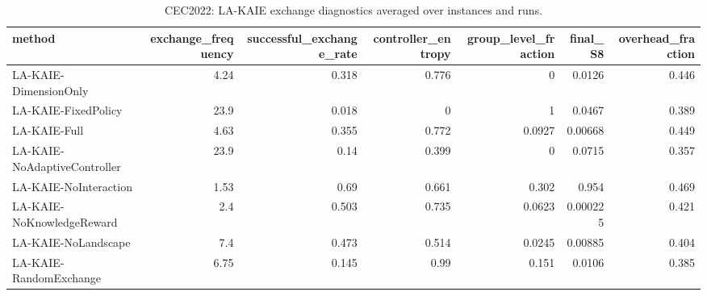 \begin{table}[t]
\centering
\scriptsize
\caption{CEC2022: LA-KAIE exchange diagnostics averaged over instances and runs.}
\label{tab:cec2022_exchange}
\begin{tabular}{lrrrrrr}
\toprule
method & exchange\_frequency & successful\_exchange\_rate & controller\_entropy & group\_level\_fraction & final\_S8 & overhead\_fraction \\
\midrule
LA-KAIE-DimensionOnly & 4.24 & 0.318 & 0.776 & 0 & 0.0126 & 0.446 \\
LA-KAIE-FixedPolicy & 23.9 & 0.018 & 0 & 1 & 0.0467 & 0.389 \\
LA-KAIE-Full & 4.63 & 0.355 & 0.772 & 0.0927 & 0.00668 & 0.449 \\
LA-KAIE-NoAdaptiveController & 23.9 & 0.14 & 0.399 & 0 & 0.0715 & 0.357 \\
LA-KAIE-NoInteraction & 1.53 & 0.69 & 0.661 & 0.302 & 0.954 & 0.469 \\
LA-KAIE-NoKnowledgeReward & 2.4 & 0.503 & 0.735 & 0.0623 & 0.000225 & 0.421 \\
LA-KAIE-NoLandscape & 7.4 & 0.473 & 0.514 & 0.0245 & 0.00885 & 0.404 \\
LA-KAIE-RandomExchange & 6.75 & 0.145 & 0.99 & 0.151 & 0.0106 & 0.385 \\
\bottomrule
\end{tabular}
\end{table}
